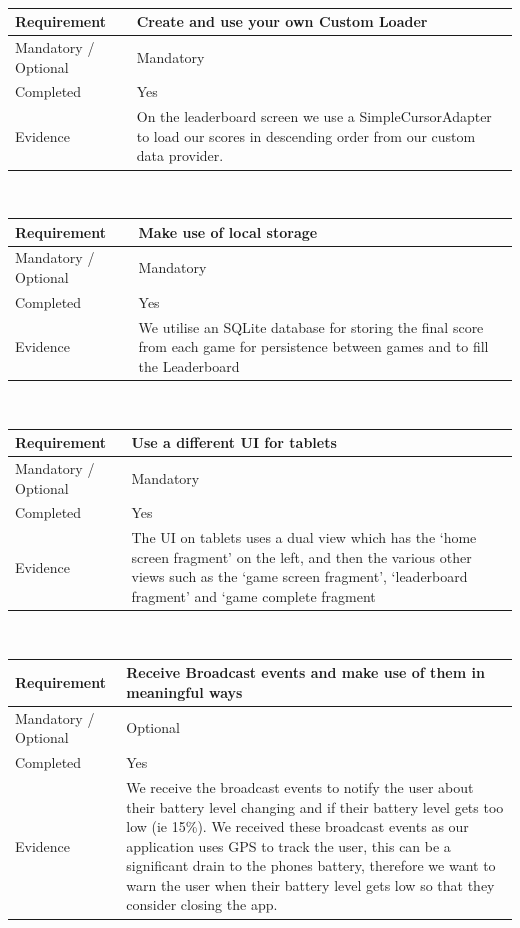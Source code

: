 \documentclass[10pt, a4paper]{article}
\begin{document}
\\
\linebreak
\linebreak
\begin{tabular}{|p{} | p{}|}
\hline 
Requirement & Create and use your own Custom Loader \\ 
\hline 
Mandatory / Optional & Mandatory \\ 
\hline 
Completed & Yes \\ 
\hline 
Evidence & On the leaderboard screen we use a SimpleCursorAdapter to load our scores in descending order from our custom data provider. \\ 
\hline 
\end{tabular}
\\
\linebreak
\linebreak
\begin{tabular}{|p{} | p{}|}
\hline 
Requirement & Make use of local storage \\ 
\hline 
Mandatory / Optional & Mandatory \\ 
\hline 
Completed & Yes \\ 
\hline 
Evidence & We utilise an SQLite database for storing the final score from each game for persistence between games and to fill the Leaderboard \\ 
\hline 
\end{tabular} 
\\
\linebreak
\linebreak
\begin{tabular}{|p{} | p{}|}
\hline 
Requirement & Use a different UI for tablets \\ 
\hline 
Mandatory / Optional & Mandatory \\ 
\hline 
Completed & Yes \\ 
\hline 
Evidence & The UI on tablets uses a dual view which has the `home screen fragment' on the left, and then the various other views such as the `game screen fragment', `leaderboard fragment' and `game complete fragment \\ 
\hline 
\end{tabular} 
\\
\linebreak
\linebreak
\begin{tabular}{|p{} | p{}|}
\hline 
Requirement & Receive Broadcast events and make use of them in meaningful ways \\ 
\hline 
Mandatory / Optional & Optional \\ 
\hline 
Completed & Yes \\ 
\hline 
Evidence & We receive the broadcast events to notify the user about their battery level changing and if their battery level gets too low (ie 15\%). We received these broadcast events as our application uses GPS to track the user, this can be a significant drain to the phones battery, therefore we want to warn the user when their battery level gets low so that they consider closing the app.\\ 
\hline 
\end{tabular} 
\end{document}

